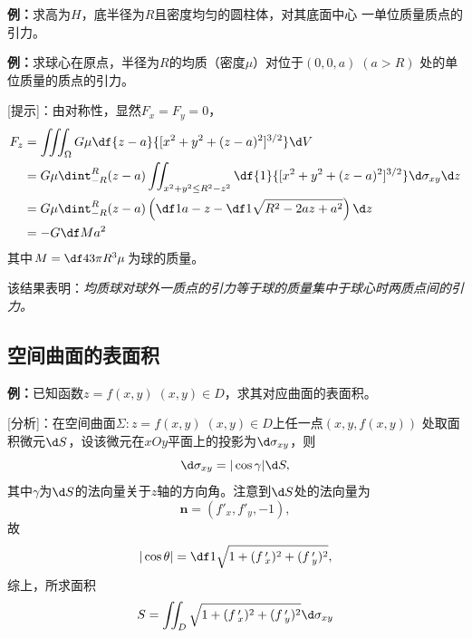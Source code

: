 {\bf 例：}求高为$H$，底半径为$R$且密度均匀的圆柱体，对其底面中心
一单位质量质点的引力。
\begin{center}
\end{center}

{\bf 例：}求球心在原点，半径为$R$的均质（密度$\mu$）对位于$(0,0,a)\;(a>R)$
处的单位质量的质点的引力。

[提示]：由对称性，显然$F_x=F_y=0$，
\begin{align*}
	F_z&=\iiint_{\Omega}G\mu\df{z-a}{[x^2+y^2+(z-a)^2]^{3/2}}\d V\\
	&=G\mu\dint_{-R}^R(z-a)\iint_{x^2+y^2\leq R^2-z^2}
	\df{1}{[x^2+y^2+(z-a)^2]^{3/2}}
	\d\sigma_{xy}\d z\\
	&=G\mu\dint_{-R}^R(z-a)
	\left(\df1{a-z}-\df1{\sqrt{R^2-2az+a^2}}\right)\d z\\
	&=-G\df M{a^2}
\end{align*}
其中$M=\df43\pi R^3\mu$为球的质量。

该结果表明：{\it 均质球对球外一质点的引力等于球的质量集中于球心时两质点间的引力。}

\subsection{空间曲面的表面积}

{\bf 例：}已知函数$z=f(x,y)\;(x,y)\in D$，求其对应曲面的表面积。

[分析]：在空间曲面$\Sigma:z=f(x,y)\;(x,y)\in D$上任一点$(x,y,f(x,y))$
处取面积微元$\d S$，设该微元在$xOy$平面上的投影为$\d\sigma_{xy}$，则
$$\d\sigma_{xy}=|\cos\gamma|\d S,$$
其中$\gamma$为$\d S$的法向量关于$z$轴的方向角。注意到$\d S$处的法向量为
$$\bm{n}=(f'_x,f'_y,-1),$$
故
$$|\cos\theta|=\df1{\sqrt{1+(f\,'_x)^2+(f\,'_y)^2}},$$
综上，所求面积
$${S=\iint_D\sqrt{1+(f\,'_x)^2+(f\,'_y)^2}\d\sigma_{xy}}$$

